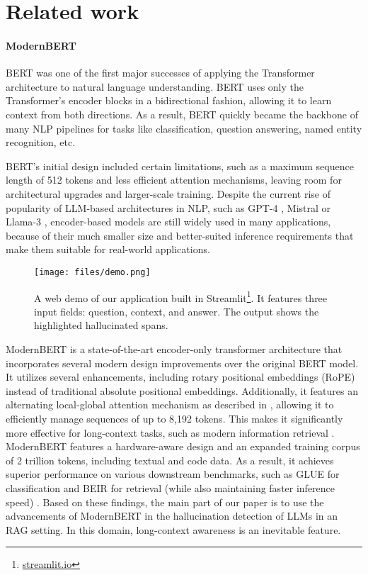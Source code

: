 \section{Related work}
\label{sec:rel}

\paragraph{ModernBERT}

BERT \cite{Devlin:2019} was one of the first major successes of applying the Transformer
architecture \cite{Vaswani:2017} to natural language understanding. BERT uses only the Transformer's
encoder blocks in a bidirectional fashion, allowing it to learn context from both directions. As a result, BERT quickly
became the backbone of many NLP pipelines for tasks like classification, question answering, named entity recognition, etc.

BERT's initial design included certain limitations, such as a maximum sequence length of 512 tokens and less efficient attention mechanisms, leaving
room for architectural upgrades and larger-scale training. Despite the current rise of popularity of LLM-based architectures in NLP, such as GPT-4 \cite{Openai:2024}, Mistral \cite{Jiang:2023} or Llama-3 \cite{Grattafiori:2024}, encoder-based models are still widely used in many applications, because of their much smaller size and better-suited inference requirements that make them suitable for real-world applications.

\begin{figure}[ht]
    \centering
    \texttt{[image: files/demo.png]}
    \caption{A web demo of our application built in Streamlit\footnote{\url{streamlit.io}}. It features three input fields: question, context, and answer. The output shows the highlighted hallucinated spans.}
    \label{fig:demo}
\end{figure}

ModernBERT \cite{Warner:2024} is a state-of-the-art encoder-only transformer architecture that incorporates several
modern design improvements over the original BERT model. It utilizes several enhancements, including rotary positional embeddings (RoPE) \cite{Su:2024} instead of traditional absolute positional embeddings. Additionally, it features an alternating local-global attention mechanism as described in \cite{Gemma:2024}, allowing it to efficiently manage sequences of up to 8,192 tokens. This makes it significantly more effective for long-context tasks, such as modern information retrieval \cite{Nussbaum:2025, Zhang:2024}. ModernBERT features a hardware-aware design and an expanded training corpus of 2 trillion tokens, including textual and code data. As a result, it achieves superior performance on various downstream benchmarks, such as GLUE for classification and BEIR for retrieval (while also maintaining faster inference speed) \cite{Nussbaum:2025, Zhang:2024}. Based on these findings, the main part of our paper is to use the advancements of ModernBERT in the hallucination detection of LLMs in an RAG setting. In this domain, long-context awareness is an inevitable feature.


